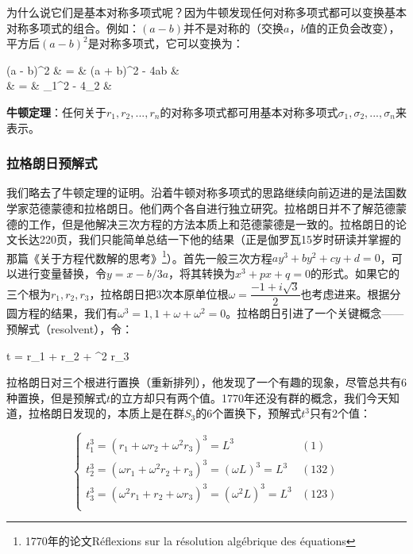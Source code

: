 \documentclass[b5paper]{ctexart}
\begin{document}
为什么说它们是基本对称多项式呢？因为牛顿发现任何对称多项式都可以变换基本对称多项式的组合。例如：$(a - b)$并不是对称的（交换$a，b$值的正负会改变），平方后$(a - b)^2$是对称多项式，它可以变换为：

\bre
(a - b)^2 & = & (a + b)^2 - 4ab &  \\
          & = & \sigma_1^2 - 4\sigma_2 &  \\
\ere

\begin{theorem}
\textbf{牛顿定理}：任何关于$r_1, r_2, ..., r_n$的对称多项式都可用基本对称多项式$\sigma_1, \sigma_2, ..., \sigma_n$来表示。
\end{theorem}

\subsubsection{拉格朗日预解式}
我们略去了牛顿定理的证明。沿着牛顿对称多项式的思路继续向前迈进的是法国数学家范德蒙德和拉格朗日。他们两个各自进行独立研究。拉格朗日并不了解范德蒙德的工作，但是他解决三次方程的方法本质上和范德蒙德是一致的。拉格朗日的论文长达220页，我们只能简单总结一下他的结果（正是伽罗瓦15岁时研读并掌握的那篇《关于方程代数解的思考》\footnote{1770年的论文Réflexions sur la résolution algébrique des équations}）。首先一般三次方程$ay^3 + by^2 + cy + d = 0$，可以进行变量替换，令$y = x - b / 3a$，将其转换为$x^3 + px + q = 0$的形式。如果它的三个根为$r_1, r_2, r_3$，拉格朗日把3次本原单位根$\omega = \dfrac{-1 + i \sqrt{3}}{2}$也考虑进来。根据分圆方程的结果，我们有$\omega^3 = 1, 1 + \omega + \omega^2 = 0$。拉格朗日引进了一个关键概念——预解式（resolvent），令：

\be
t = r_1 + \omega r_2 + \omega^2 r_3
\ee

拉格朗日对三个根进行置换（重新排列），他发现了一个有趣的现象，尽管总共有6种置换，但是预解式$t$的立方却只有两个值。1770年还没有群的概念，我们今天知道，拉格朗日发现的，本质上是在群$S_3$的6个置换下，预解式$t^3$只有2个值：

\[
\begin{cases}
t_1^3 = (r_1 + \omega r_2 + \omega^2 r_3)^3 = L^3 & (1) \\
t_2^3 = (\omega r_1 + \omega^2 r_2 + r_3)^3 = (\omega L)^3 = L^3 & (132) \\
t_3^3 = (\omega^2 r_1 + r_2 + \omega r_3)^3 = (\omega^2 L)^3 = L^3 & (123) \\
\end{cases}
\]
\end{document}
